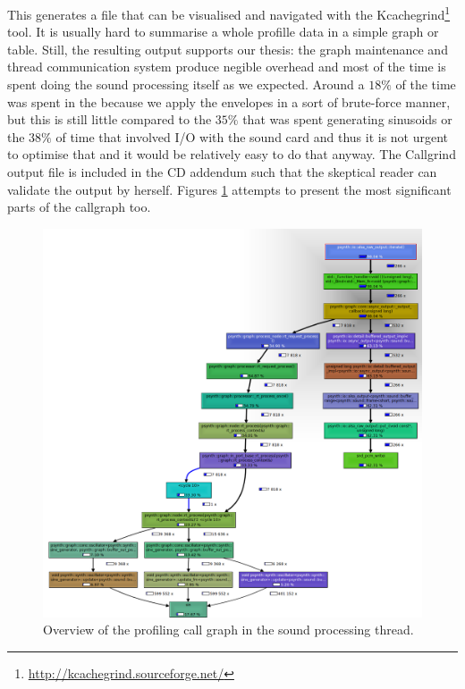This generates a  file that can be
visualised and navigated with the
Kcachegrind\footnote{\url{http://kcachegrind.sourceforge.net/}}
tool. It is usually hard to summarise a whole profille data in a
simple graph or table. Still, the resulting output supports our
thesis: the graph maintenance and thread communication system produce
negible overhead and most of the time is spent doing the sound
processing itself as we expected. Around a $18\%$ of the time was
spent in the  because we apply the envelopes
in a sort of brute-force manner, but this is still little compared to
the $35\%$ that was spent generating sinusoids or the $38\%$ of time
that involved I/O with the sound card and thus it is not urgent to
optimise that and it would be relatively easy to do that anyway. The
Callgrind output file is included in the CD addendum such that the
skeptical reader can validate the output by herself. Figures
\ref{fig:callgrind-1} attempts to present the most significant parts
of the callgraph too.

\begin{figure}[h!]
  \centering
  \includegraphics[width=\textwidth]{pic/callgrind1.png}
  \caption{Overview of the profiling call graph in the sound
    processing thread.}
  \label{fig:callgrind-1}
\end{figure}

